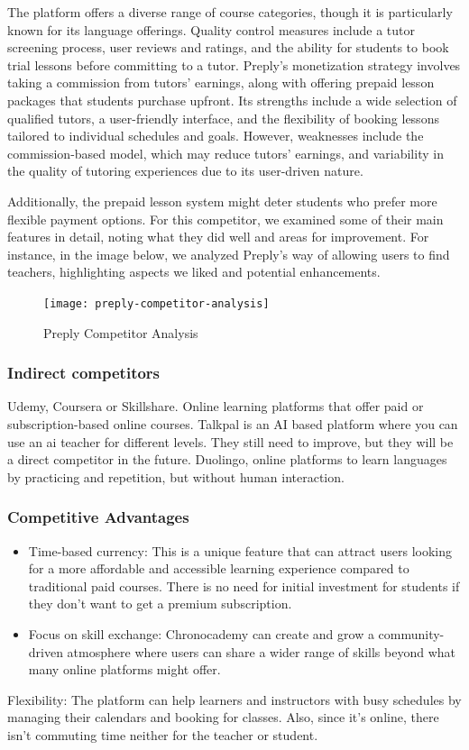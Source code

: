 The platform offers a diverse range of course categories, though it is particularly known for its language offerings.
Quality control measures include a tutor screening process, user reviews and ratings, and the ability for students to book trial lessons before committing to a tutor.
Preply's monetization strategy involves taking a commission from tutors' earnings, along with offering prepaid lesson packages that students purchase upfront.
Its strengths include a wide selection of qualified tutors, a user-friendly interface, and the flexibility of booking lessons tailored to individual schedules and goals.
However, weaknesses include the commission-based model, which may reduce tutors' earnings, and variability in the quality of tutoring experiences due to its user-driven nature.

Additionally, the prepaid lesson system might deter students who prefer more flexible payment options.
For this competitor, we examined some of their main features in detail, noting what they did well and areas for improvement.
For instance, in the image below, we analyzed Preply's way of allowing users to find teachers, highlighting aspects we liked and potential enhancements.

\begin{figure}[h]
    \centering
    \texttt{[image: preply-competitor-analysis]}
    \caption{Preply Competitor Analysis}
    \label{fig:figure10}
\end{figure}
\clearpage

\subsubsection{Indirect competitors}
Udemy, Coursera or Skillshare.
Online learning platforms that offer paid or subscription-based online courses.
Talkpal is an AI based platform where you can use an ai teacher for different levels.
They still need to improve, but they will be a direct competitor in the future.
Duolingo, online platforms to learn languages by practicing and repetition, but without human interaction.

\subsubsection{Competitive Advantages}
\begin{itemize}
    \item Time-based currency: This is a unique feature that can attract users looking for a more affordable and accessible learning experience compared to traditional paid courses.
    There is no need for initial investment for students if they don’t want to get a premium subscription.
    \item Focus on skill exchange: Chronocademy can create and grow a community-driven atmosphere where users can share a wider range of skills beyond what many online platforms might offer.
\end{itemize}
Flexibility: The platform can help learners and instructors with busy schedules by managing their calendars and booking for classes.
Also, since it’s online, there isn’t commuting time neither for the teacher or student.

